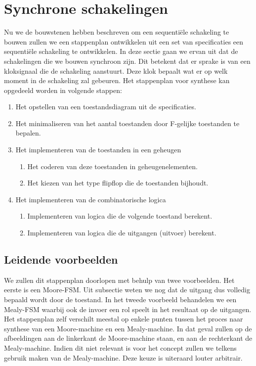 \section{Synchrone schakelingen}
Nu we de bouwstenen hebben beschreven om een sequenti\"ele schakeling te bouwen zullen we een stappenplan ontwikkelen uit een set van specificaties een sequenti\"ele schakeling te ontwikkelen. In deze sectie gaan we ervan uit dat de schakelingen die we bouwen synchroon zijn. Dit betekent dat er sprake is van een kloksignaal die de schakeling aanstuurt. Deze klok bepaalt wat er op welk moment in de schakeling zal gebeuren. Het stappenplan voor synthese kan opgedeeld worden in volgende stappen:
\begin{enumerate}
 \item Het opstellen van een toestandsdiagram uit de specificaties.
 \item Het minimaliseren van het aantal toestanden door F-gelijke toestanden te bepalen.
 \item Het implementeren van de toestanden in een geheugen
 \begin{enumerate}
  \item Het coderen van deze toestanden in geheugenelementen.
  \item Het kiezen van het type flipflop die de toestanden bijhoudt.
 \end{enumerate}
 \item Het implementeren van de combinatorische logica
 \begin{enumerate}
  \item Implementeren van logica die de volgende toestand berekent.
  \item Implementeren van logica die de uitgangen (uitvoer) berekent.
 \end{enumerate}
\end{enumerate}

\subsection{Leidende voorbeelden}
We zullen dit stappenplan doorlopen met behulp van twee voorbeelden. Het eerste is een Moore-FSM. Uit subsectie  weten we nog dat de uitgang dus volledig bepaald wordt door de toestand. In het tweede voorbeeld behandelen we een Mealy-FSM waarbij ook de invoer een rol speelt in het resultaat op de uitgangen. Het stappenplan zelf verschilt meestal op enkele punten tussen het proces naar synthese van een Moore-machine en een Mealy-machine. In dat geval zullen op de afbeeldingen aan de linkerkant de Moore-machine staan, en aan de rechterkant de Mealy-machine. Indien dit niet relevant is voor het concept zullen we telkens gebruik maken van de Mealy-machine. Deze keuze is uiteraard louter arbitrair.

